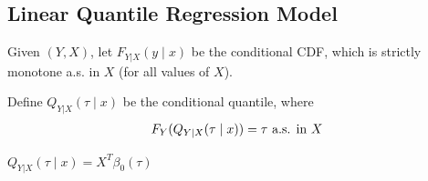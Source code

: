 \documentclass[11pt]{elegantbook}
\begin{document}
\subsection{Linear Quantile Regression Model}
Given $(Y,X)$, let $F_{Y|X}(y\mid x)$ be the conditional CDF, which is strictly monotone a.s. in $X$ (for all values of $X$).

Define $Q_{Y|X}(\tau\mid x)$ be the conditional quantile, where
\begin{equation}
    \begin{aligned}
        F_Y(Q_{Y|X}(\tau\mid x))=\tau \textnormal{ a.s. in $X$}
    \end{aligned}
    \nonumber
\end{equation}

\begin{definition}
\normalfont
    $Q_{Y|X}(\tau\mid x)=X^T\beta_0(\tau)$
\end{definition}
\end{document}
